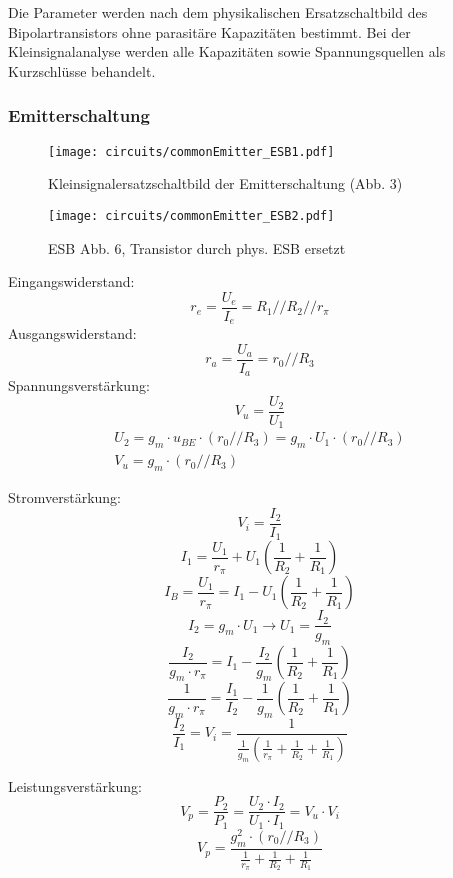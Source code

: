 Die Parameter werden nach dem physikalischen Ersatzschaltbild des
Bipolartransistors ohne parasitäre Kapazitäten bestimmt. Bei der
Kleinsignalanalyse werden alle Kapazitäten sowie Spannungsquellen als
Kurzschlüsse behandelt.

\subsubsection{Emitterschaltung}

\begin{figure}[H]
  \begin{center}
    \texttt{[image: circuits/commonEmitter\_ESB1.pdf]}
  \end{center}
  \caption{Kleinsignalersatzschaltbild der Emitterschaltung (Abb. 3)}
\end{figure}

\begin{figure}[H]
  \begin{center}
    \texttt{[image: circuits/commonEmitter\_ESB2.pdf]}
  \end{center}
  \caption{ESB Abb. 6, Transistor durch phys. ESB ersetzt}
\end{figure}

\noindent Eingangswiderstand:
\[r_e = \frac{U_e}{I_e} = R_1 // R_2 // r_\pi\]
\noindent Ausgangswiderstand:
\[r_a = \frac{U_a}{I_a} = r_0 // R_3 \]
\noindent Spannungsverstärkung:
\[V_u = \frac{U_2}{U_1}\]
\begin{gather*}
  U_2 = g_m \cdot u_{BE} \cdot (r_0 // R_3) = g_m \cdot U_1 \cdot (r_0 // R_3)\\
  V_u = g_m \cdot (r_0 // R_3)
\end{gather*}

\noindent Stromverstärkung:
\[V_i = \frac{I_2}{I_1}\]
\[I_1 = \frac{U_1}{r_\pi} + U_1 (\frac{1}{R_2} + \frac{1}{R_1})\]
\[I_B = \frac{U_1}{r_\pi} = I_1 - U_1 (\frac{1}{R_2} + \frac{1}{R_1})\]
\[I_2 = g_m \cdot U_1 \rightarrow U_1 = \frac{I_2}{g_m}\]
\[ \frac{I_2}{g_m \cdot r_\pi}  = I_1 - \frac{I_2}{g_m} (\frac{1}{R_2} + \frac{1}{R_1}) \]
\[ \frac{1}{g_m \cdot r_\pi}  = \frac{I_1}{I_2} - \frac{1}{g_m} (\frac{1}{R_2} + \frac{1}{R_1}) \]
\[\frac{I_2}{I_1} = V_i = \frac{1}{ \frac{1}{g_m} (\frac{1}{r_\pi} +
    \frac{1}{R_2} + \frac{1}{R_1}) }\]

\noindent Leistungsverstärkung:
\[V_p = \frac{P_2}{P_1} = \frac{U_2 \cdot I_2}{U_1 \cdot I_1} = V_u \cdot V_i\]
\[V_p = \frac{g_m^2 \cdot (r_0 // R_3)}{\frac{1}{r_{\pi}} + \frac{1}{R_2} + \frac{1}{R_1}}\]

